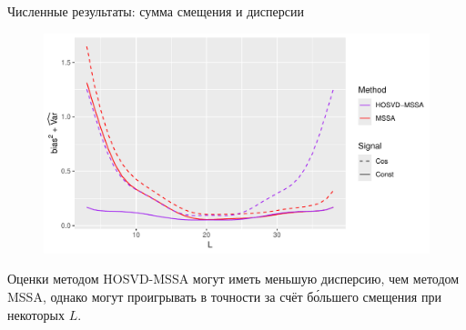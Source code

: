\documentclass[pdf, unicode, 9pt, notheorems, handout]{beamer}
\begin{document}
    \begin{frame}{Численные результаты: сумма смещения и дисперсии}
        \begin{figure}
            \centering
            \includegraphics[width=\textwidth]{./img/approx_sep_large_noise_mse}
        \end{figure}
        Оценки методом HOSVD-MSSA могут иметь меньшую дисперсию, чем методом MSSA, однако могут проигрывать в точности за счёт
        б\'{о}льшего смещения при некоторых $L$.
    \end{frame}
   
    
\end{document}
